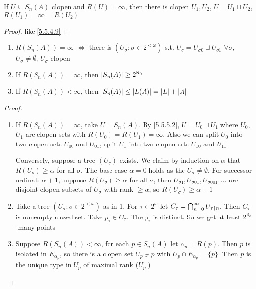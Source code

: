 \documentclass[11pt]{article}
\begin{document}
\begin{lemma}[]
\label{5.5.5.2}
If \(U\subseteq S_n(A)\) clopen and \(R(U)=\infty\), then there is
clopen \(U_1,U_2\), \(U=U_1\sqcup U_2\), \(R(U_1)=\infty=R(U_2)\)
\end{lemma}

\begin{proof}
like \ref{5.5.4.9}
\end{proof}

\begin{lemma}[]
\begin{enumerate}
\item \(R(S_n(A))=\infty\) \(\Leftrightarrow\) there is \((U_\sigma:\sigma\in 2^{<\omega})\)
s.t. \(U_\sigma=U_{\sigma 0}\sqcup U_{\sigma 1}\) \(\forall\sigma\), \(U_\sigma\neq\emptyset\), \(U_\sigma\) clopen
\item If \(R(S_n(A))=\infty\), then \(\abs{S_n(A)}\ge 2^{\aleph_0}\)
\item If \(R(S_n(A))<\infty\), then \(\abs{S_n(A)}\le\abs{L(A)}=\abs{L}+\abs{A}\)
\end{enumerate}
\end{lemma}

\begin{proof}
\begin{enumerate}
\item If \(R(S_n(A))=\infty\), take \(U=S_n(A)\). By \ref{5.5.5.2}, \(U=U_0\sqcup U_1\) where \(U_0\), \(U_1\)
are clopen sets with \(R(U_0)=R(U_1)=\infty\). Also we can split \(U_0\) into two clopen
sets \(U_{00}\) and \(U_{01}\), split \(U_1\) into two clopen sets \(U_{10}\) and \(U_{11}\)

Conversely, suppose a tree \((U_\sigma)\) exists. We claim by induction on \(\alpha\) that \(R(U_\sigma)\ge\alpha\) for
all \(\sigma\). The base case \(\alpha=0\) holds as the \(U_\sigma\neq\emptyset\). For successor ordinals \(\alpha+1\),
suppose \(R(U_\sigma)\ge\alpha\) for all \(\sigma\), then \(U_{\sigma 1},U_{\sigma 01},U_{\sigma 001},\dots\) are disjoint clopen
subsets of \(U_\sigma\) with rank \(\ge\alpha\), so \(R(U_\sigma)\ge\alpha+1\)
\item Take a tree \((U_\sigma:\sigma\in 2^{<\omega})\) as in 1. For \(\tau\in 2^\omega\) let \(C_\tau=\bigcap_{n=0}^\infty U_{\tau\upharpoonright n}\).
Then \(C_\tau\) is nonempty closed set. Take \(p_\tau\in C_\tau\). The \(p_\tau\) is distinct. So we get at
least \(2^{\aleph_0}\)-many points
\item Suppose \(R(S_n(A))<\infty\), for each \(p\in S_n(A)\) let \(\alpha_p=R(p)\). Then \(p\) is isolated
in \(E_{\alpha_p}\), so there is a clopen set \(U_p\ni p\) with \(U_p\cap E_{\alpha_p}=\{p\}\). Then \(p\) is
the unique type in \(U_p\) of maximal rank (\(U_p\) )
\end{enumerate}
\end{proof}
\end{document}
